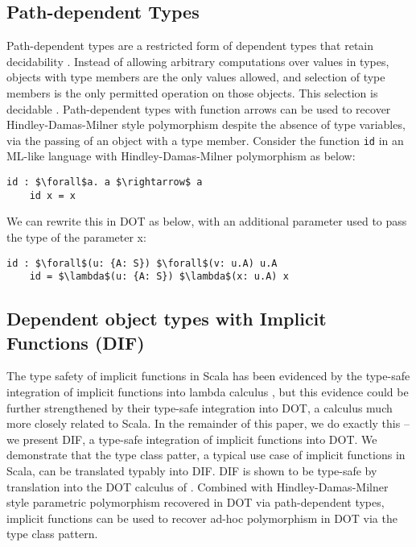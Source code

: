 \subsection{Path-dependent Types}
Path-dependent types are a restricted form of dependent types that retain decidability . Instead of allowing arbitrary computations over values in types, objects with type members are the only values allowed, and  selection of type members is the only permitted operation on those objects. This
selection is decidable . Path-dependent types with function arrows can be used to recover Hindley-Damas-Milner style polymorphism despite the absence of type variables, via the passing of an object with a type member. Consider the function \texttt{id} in an ML-like language with Hindley-Damas-Milner polymorphism as below:

\begin{minipage}{\linewidth}
\begin{lstlisting}[mathescape]
    id : $\forall$a. a $\rightarrow$ a
    id x = x
\end{lstlisting}
\end{minipage}

We can rewrite this in DOT as below, with an additional parameter used to pass the type of the parameter x:

\begin{minipage}{\linewidth}
\begin{lstlisting}[mathescape]
    id : $\forall$(u: {A: S}) $\forall$(v: u.A) u.A
    id = $\lambda$(u: {A: S}) $\lambda$(x: u.A) x
\end{lstlisting}
\end{minipage}

\subsection{Dependent object types with Implicit Functions (DIF)}

The type safety of implicit functions in Scala has been evidenced by the
type-safe integration of implicit functions into lambda calculus \cite{OBLB18},
but this evidence could be further strengthened by their type-safe integration
into DOT, a calculus much more closely related to Scala. In the remainder of
this paper, we do exactly this -- we present DIF, a type-safe integration of
implicit functions into DOT. We demonstrate that the type class patter, a
typical use case of implicit functions in Scala, can be translated typably into
DIF. DIF is shown to be type-safe by translation into the DOT calculus of
\cite{AGORS16}. Combined with Hindley-Damas-Milner style parametric polymorphism recovered in DOT via path-dependent types, implicit functions can be used to recover ad-hoc polymorphism in DOT via the type class pattern.

